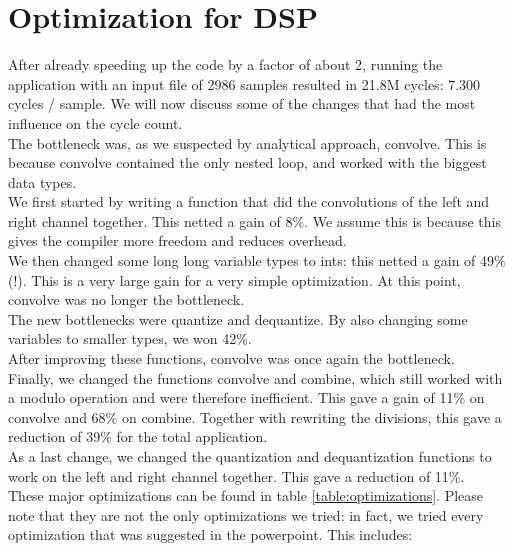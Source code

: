 \documentclass[a4paper]{article}
\begin{document}
\section{Optimization for DSP}
After already speeding up the code by a factor of about 2, running the application with an input file of 2986 samples resulted in 21.8M cycles: 7.300 cycles / sample. 
We will now discuss some of the changes that had the most influence on the cycle count. \\
The bottleneck was, as we suspected by analytical approach, convolve. This is because convolve contained the only nested loop, and worked with the biggest data types. \\
We first started by writing a function that did the convolutions of the left and right channel together. This netted a gain of 8\%. We assume this is because this gives the compiler more freedom and reduces overhead. \\
We then changed some long long variable types to ints: this netted a gain of 49\% (!). This is a very large gain for a very simple optimization. At this point, convolve was no longer the bottleneck. \\
The new bottlenecks were quantize and dequantize. By also changing some variables to smaller types, we won 42\%.
\\
After improving these functions, convolve was once again the bottleneck. \\
Finally, we changed the functions convolve and combine, which still worked with a modulo operation and were therefore inefficient. This gave a gain of 11\% on convolve and 68\% on combine. Together with rewriting the divisions, this gave a reduction of 39\% for the total application. \\
As a last change, we changed the quantization and dequantization functions to work on the left and right channel together. This gave a reduction of 11\%.\\
These major optimizations can be found in table \ref{table:optimizations}. Please note that they are not the only optimizations we tried: in fact, we tried every optimization that was suggested in the powerpoint. This includes:
\end{document}
